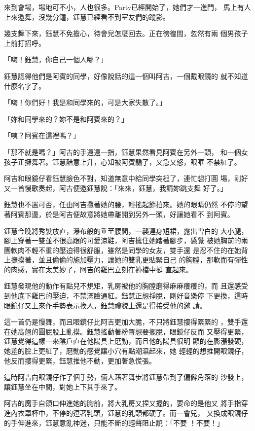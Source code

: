 來到會場，場地可不小，人也很多。Party已經開始了，她們才一進門，
馬上有人上來邀舞，沒幾分鐘，鈺慧已經看不到室友們的蹤影。

幾支舞下來，鈺慧不免擔心，待會兒怎麼回去。正在徬徨間，忽然有兩
個男孩子上前打招呼。

「嗨！鈺慧，你自己一個人哪？」

鈺慧認得他們是阿賓的同學，好像說話的這一個叫阿吉，一個戴眼鏡的
就不知道什麼名字了。

「嗨！你們好！我是和同學來的，可是大家失散了。」

「妳和同學來的？妳不是和阿賓來的？」

「咦？阿賓在這裡嗎？」

「那不就是嗎？」阿吉的手遠遠一指，鈺慧果然看見阿賓在另外一頭，
和一個女孩子正擁舞著。鈺慧醋意上升，心知被阿賓騙了，又急又怒，眼眶
不禁紅了。

阿吉和眼鏡仔看鈺慧臉色不對，知道無意中給同學突槌了，連忙想打圓
場，剛好又一首慢歌奏起，阿吉便邀鈺慧說：「來來，鈺慧，我請妳跳支舞
好了。」

鈺慧也不置可否，任由阿吉攬著她的腰，輕搖起節拍來。她的眼睛仍然
不停的望著阿賓那邊，於是阿吉便故意將她帶離開到另外一頭，好讓她看不
到阿賓。

鈺慧今晚將秀髮放直，瀑布般的垂至腰間，一襲連身短裙，露出雪白的
大小腿，腳上穿著一雙並不很高跟的可愛涼鞋，阿吉擁住她踏著腳步，感覺
被她胸前的兩團軟肉不輕不重的壓迫得很舒服，雖然是同學的女友，雙手還
是忍不住的在她背上撫摸著，並且偷偷的施加壓力，讓她的雙乳更貼緊自己
的胸膛，那軟而有彈性的肉感，實在太美妙了，阿吉的雞巴立刻在褲檔中挺
直起來。

鈺慧發現他的動作有點兒不規矩，乳房被他的胸膛磨得麻麻癢癢的，而
且還感受到他底下雞巴的壓迫，不禁滿臉通紅。鈺慧正想掙脫，剛好音樂停
下更換，這時眼鏡仔又上來作手勢表示換人，鈺慧禮貌上還是得接受他的邀
請。

這一首仍是慢舞，而且眼鏡仔比阿吉更加大膽，不只將鈺慧摟得緊緊的
，雙手還在她高翹的圓屁股上亂摸。鈺慧搖動著粉臀想要擺脫，眼鏡仔反而
又壓得更緊，鈺慧覺得這樣一來陰戶直在他陽具上磨動，而且他的陽具很明
顯的在膨漲發硬，她羞的臉上更紅了，磨動的感覺讓小穴有點潮濕起來，她
輕輕的想推開眼鏡仔，他反而摟得更緊，鈺慧推他不動，更加著急慌張。

這時阿吉向眼鏡仔作了個手勢，倆人藉著舞步將鈺慧帶到了偏僻角落的
沙發上，讓鈺慧坐在中間，對她上下其手來了。

阿吉的魔手自領口伸進她的胸前，將大乳房又捏又握的，要命的是他又
將手指穿進內衣罩杯中，不停的逗著乳頭，鈺慧的乳頭都硬了。而一會兒，
又換成眼鏡仔的手伸進來，鈺慧意亂神迷，只能不斷的輕聲阻止說：「不要
！不要！」

